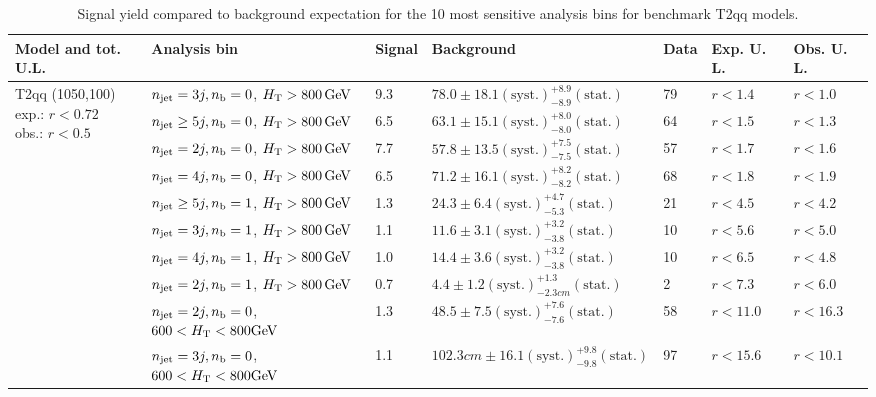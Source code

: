 \begin{table}[h!] 
  \scriptsize
  \caption{ 
Signal yield compared to background expectation for the 10 most sensitive analysis bins 
for benchmark T2qq models.
  \label{tab:sigBenchmarksYields_T2qq}}
  \centering 
  \begin{tabular}{ lllllll } 
    \hline 
    \hline 
    Model and tot. U.L. & Analysis bin & Signal & Background & Data & Exp. U. L. & Obs. U. L. \\ \hline
\multirow{10}{*}{\parbox[t]{2.3cm}{T2qq (1050,100)\\exp.: $r<0.72$\\obs.: $r<0.5$}}
 & $n_{\mathrm{jet}} =3j,n_{\text{b}} =0$, $\mbox{$H_\text{T}$} > 800 \, \mathrm{GeV}$ & 9.3 & $78.0 \pm 18.1 \mathrm{(syst.)} ^{+8.9}_{-8.9} \mathrm{(stat.)}$ & 79 & $r < 1.4$ & $r < 1.0$\\ 
 & $n_{\mathrm{jet}} \geq5j,n_{\text{b}} =0$, $\mbox{$H_\text{T}$} > 800 \, \mathrm{GeV}$ & 6.5 & $63.1 \pm 15.1 \mathrm{(syst.)} ^{+8.0}_{-8.0} \mathrm{(stat.)}$ & 64 & $r < 1.5$ & $r < 1.3$\\ 
 & $n_{\mathrm{jet}} =2j,n_{\text{b}} =0$, $\mbox{$H_\text{T}$} > 800 \, \mathrm{GeV}$ & 7.7 & $57.8 \pm 13.5 \mathrm{(syst.)} ^{+7.5}_{-7.5} \mathrm{(stat.)}$ & 57 & $r < 1.7$ & $r < 1.6$\\ 
 & $n_{\mathrm{jet}} =4j,n_{\text{b}} =0$, $\mbox{$H_\text{T}$} > 800 \, \mathrm{GeV}$ & 6.5 & $71.2 \pm 16.1 \mathrm{(syst.)} ^{+8.2}_{-8.2} \mathrm{(stat.)}$ & 68 & $r < 1.8$ & $r < 1.9$\\ 
 & $n_{\mathrm{jet}} \geq5j,n_{\text{b}} =1$, $\mbox{$H_\text{T}$} > 800 \, \mathrm{GeV}$ & 1.3 & $24.3 \pm 6.4 \mathrm{(syst.)} ^{+4.7}_{-5.3} \mathrm{(stat.)}$ & 21 & $r < 4.5$ & $r < 4.2$\\ 
 & $n_{\mathrm{jet}} =3j,n_{\text{b}} =1$, $\mbox{$H_\text{T}$} > 800 \, \mathrm{GeV}$ & 1.1 & $11.6 \pm 3.1 \mathrm{(syst.)} ^{+3.2}_{-3.8} \mathrm{(stat.)}$ & 10 & $r < 5.6$ & $r < 5.0$\\ 
 & $n_{\mathrm{jet}} =4j,n_{\text{b}} =1$, $\mbox{$H_\text{T}$} > 800 \, \mathrm{GeV}$ & 1.0 & $14.4 \pm 3.6 \mathrm{(syst.)} ^{+3.2}_{-3.8} \mathrm{(stat.)}$ & 10 & $r < 6.5$ & $r < 4.8$\\ 
 & $n_{\mathrm{jet}} =2j,n_{\text{b}} =1$, $\mbox{$H_\text{T}$} > 800 \, \mathrm{GeV}$ & 0.7 & $4.4 \pm 1.2 \mathrm{(syst.)} ^{+1.3}_{-2.3cm} \mathrm{(stat.)}$ & 2 & $r < 7.3$ & $r < 6.0$\\ 
 & $n_{\mathrm{jet}} =2j,n_{\text{b}} =0$, $600 < \mbox{$H_\text{T}$} < 800 \mathrm{GeV}$ & 1.3 & $48.5 \pm 7.5 \mathrm{(syst.)} ^{+7.6}_{-7.6} \mathrm{(stat.)}$ & 58 & $r < 11.0$ & $r < 16.3$\\ 
 & $n_{\mathrm{jet}} =3j,n_{\text{b}} =0$, $600 < \mbox{$H_\text{T}$} < 800 \mathrm{GeV}$ & 1.1 & $102.3cm \pm 16.1 \mathrm{(syst.)} ^{+9.8}_{-9.8} \mathrm{(stat.)}$ & 97 & $r < 15.6$ & $r < 10.1$\\ \hline

\end{tabular}
\end{table}
